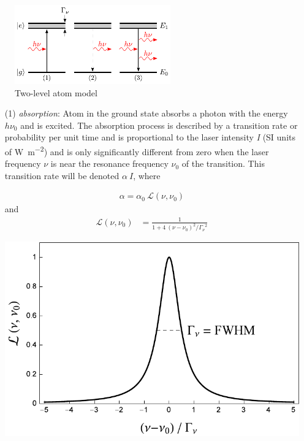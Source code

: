 \begin{figure}[h]
    \centering
    \includegraphics[width=0.6\textwidth]{twolevel}
    \caption{\label{fig:twolevel}Two-level atom model}
\end{figure}


\begin{itemize}
\item[(1)] \textit{absorption}: Atom in the ground state absorbs a photon with 
    the energy \(h \nu_0 \) and is excited. The absorption process is described
    by a transition rate or probability per unit time and is proportional to the
    laser intensity \textit{I} (SI units of \si{\watt\per\meter\squared}) and is
    only significantly different from zero when the laser frequency \(\nu \) is
    near the resonance frequency \(\nu_0 \) of the transition. This transition
    rate will be denoted \(\alpha~I \), where

    \bigskip
    \begin{minipage}[c][][c]{.45\textwidth}
        \begin{align}\label{eq:alpha}
            \alpha = \alpha_0~\mathcal{L}(\nu,\nu_0)
        \end{align}
        and
        \begin{align}
            \mathcal{L}(\nu,\nu_0) &= \frac{1}{ 1+4~{(\nu-\nu_0)}^2 / {\Gamma_\nu}^2 }
        \end{align}
    \end{minipage}
    \hfill
    \begin{minipage}[c]{.45\textwidth}
        \centering
        \includegraphics[width=.9\textwidth]{nLinewidth}
    \end{minipage}


\end{itemize}
